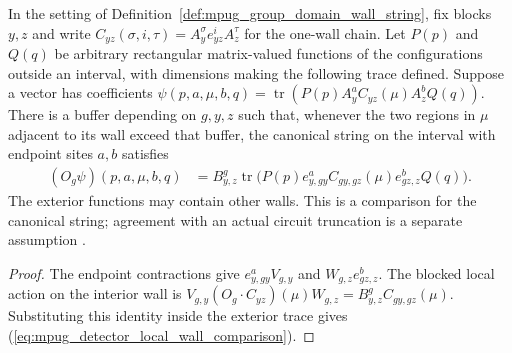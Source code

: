 \begin{lemma}
    \label{lem:mpug_detector_local_wall_comparison}
    \leanok
    In the setting of Definition~\ref{def:mpug_group_domain_wall_string},
    fix blocks $y,z$ and write
    $C_{yz}(\sigma,i,\tau)=A_y^{\sigma}e_{yz}^iA_z^{\tau}$ for the
    one-wall chain. Let $P(p)$ and $Q(q)$ be arbitrary rectangular
    matrix-valued functions of the configurations outside an interval,
    with dimensions making the following trace defined. Suppose a vector
    has coefficients
    $\psi(p,a,\mu,b,q)=\operatorname{tr}(P(p)A_y^aC_{yz}(\mu)A_z^bQ(q))$.
    There is a buffer depending on $g,y,z$ such that, whenever the two
    regions in $\mu$ adjacent to its wall exceed that buffer, the
    canonical string on the interval with endpoint sites $a,b$ satisfies
    \begin{align}
        (O_g\psi)(p,a,\mu,b,q)
         & =B^g_{y,z}\operatorname{tr}\bigl(P(p)e_{y,gy}^a
        C_{gy,gz}(\mu)e_{gz,z}^bQ(q)\bigr).
        \label{eq:mpug_detector_local_wall_comparison}
    \end{align}
    The exterior functions may contain other walls. This is a comparison
    for the canonical string; agreement with an actual circuit truncation
    is a separate assumption
    \cite{gap:gs24_truncation_detector_endpoint_dependence}.
\end{lemma}

\begin{proof}\leanok
    The endpoint contractions give $e_{y,gy}^aV_{g,y}$ and
    $W_{g,z}e_{gz,z}^b$. The blocked local action on the interior wall is
    $V_{g,y}(O_g\cdot C_{yz})(\mu)W_{g,z}=B^g_{y,z}C_{gy,gz}(\mu)$.
    Substituting this identity inside the exterior trace gives
    (\ref{eq:mpug_detector_local_wall_comparison}).
\end{proof}

